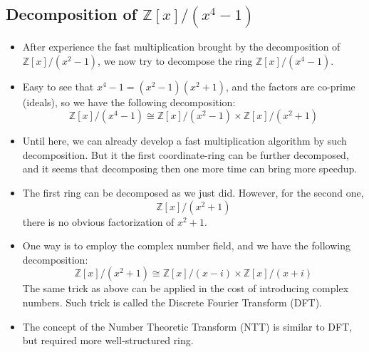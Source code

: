 \subsection{Decomposition of \( \mathbb{Z}[x]/(x^4-1) \)}

\begin{frame}
    \begin{itemize}
        \item <1->After experience the fast multiplication brought by the decomposition of 
            \( \mathbb{Z}[x]/(x^{2}-1) \), we now try to decompose the ring 
            \( \mathbb{Z}[x]/(x^{4}-1) \).
        \item <2->Easy to see that \(x^{4}-1 = (x^{2}-1)(x^2+1)\), 
            and the factors are co-prime (ideals),
            so we have the following decomposition:
            \[ \mathbb{Z}[x]/(x^4 - 1) \cong 
            \mathbb{Z}[x]/(x^2 - 1) \times 
            \mathbb{Z}[x]/(x^2 + 1) \]
        \item <3->Until here, we can already develop a fast multiplication algorithm by such decomposition.
            But it the first coordinate-ring can be further decomposed,
            and it seems that decomposing then one more time can bring more speedup.
        \item <4->The first ring can be decomposed as we just did.
            However, for the second one,
            \[ \mathbb{Z}[x]/(x^2 + 1) \]
            there is no obvious factorization of \(x^2 + 1\).
        \item <5->One way is to employ the complex number field, 
            and we have the following decomposition:
            \[ \mathbb{Z}[x]/(x^2 + 1) \cong 
            \mathbb{Z}[x]/(x - i) \times 
            \mathbb{Z}[x]/(x + i) \]
            The same trick as above can be applied in the cost of introducing complex numbers.
            Such trick is called the Discrete Fourier Transform (DFT).
        \item <6->The concept of the Number Theoretic Transform (NTT) is similar to DFT, 
            but required more well-structured ring.
    \end{itemize}
\end{frame}

